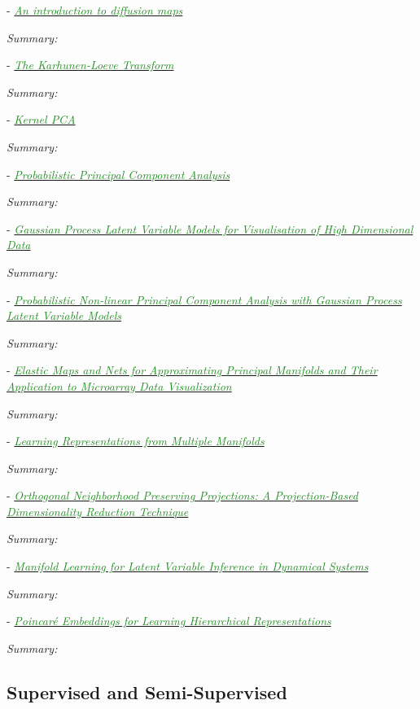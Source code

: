 \documentclass[]{article}
\newcommand{\paperentry}[4]{
            \hangindent=1cm
            \cite{#1} - \href{run:../References/#3}{\textcolor{ForestGreen}{\textit{#2}}}
            
            \noindent            
            \begin{minipage}[t]{0.1\linewidth}\hfill\end{minipage}
            \begin{minipage}[t]{0.8\linewidth}\textcolor{NavyBlue}{{\textit{Summary:}}}#4\end{minipage}
            \vspace{.25cm}
          }
\begin{document}
	\paperentry{Delaporte2008DiffusionMaps}
	{An introduction to diffusion maps}
	{Manifold_Representation_Learning/Manifold/Delaporte2008DiffusionMaps}
	{}
	
	\paperentry{Theodoris2008PCA}
	{The Karhunen-Loeve Transform}
	{}
	{}
	
	\paperentry{Theodoris2008KPCA}
	{Kernel PCA}
	{}
	{}
	
	\paperentry{Tipping1999PPCA}
	{Probabilistic Principal Component Analysis}
	{Manifold_Representation_Learning/Manifold/Tipping1999PPCA.pdf}
	{}
	
	\paperentry{Lawrence2003GPLVM}
	{Gaussian Process Latent Variable Models for Visualisation of High Dimensional Data}
	{Manifold_Representation_Learning/Manifold/Lawrence2003GPLVM.pdf}
	{}
	
	\paperentry{Lawrence2005PPCAGPLVModels}
	{Probabilistic Non-linear Principal Component Analysis with Gaussian Process Latent Variable Models}
	{Manifold_Representation_Learning/Manifold/Lawrence2005PPCAGPLVModels.pdf}
	{}
	
	\paperentry{Gorban2007ElasticMaps}
	{Elastic Maps and Nets for Approximating Principal Manifolds and Their Application to Microarray Data Visualization}
	{Manifold_Representation_Learning/Manifold/Gorban2007ElasticMaps.pdf}
	{}
	
	\paperentry{Lee2015MultipleManifolds}
	{Learning Representations from Multiple Manifolds}
	{Manifold_Representation_Learning/Manifold/Lee2015MultipleManifolds.pdf}
	{}
	
	\paperentry{Kokiopoulou2007OrthoNeighborhoodPreservingProjections}
	{Orthogonal Neighborhood Preserving Projections: A Projection-Based Dimensionality Reduction Technique}
	{Manifold_Representation_Learning/Manifold/Kokiopoulou2007OrthoNeighborhoodPreservingProjections.pdf}
	{}
	
	\paperentry{Talmon2015ManifoldLearningInDynamicalSystems}
	{Manifold Learning for Latent Variable Inference in Dynamical Systems}
	{Manifold_Representation_Learning/Manifold/Talmon2015ManifoldLearningInDynamicalSystems.pdf}
	{}
	
	\paperentry{Nickel2017PoincareEmbeddings}
	{Poincar\'{e} Embeddings for Learning Hierarchical Representations}
	{Manifold_Representation_Learning/Manifold/Nickel2017PoincareEmbeddings.pdf}
	{}
	
	\subsection{Supervised and Semi-Supervised}
	
\end{document}
